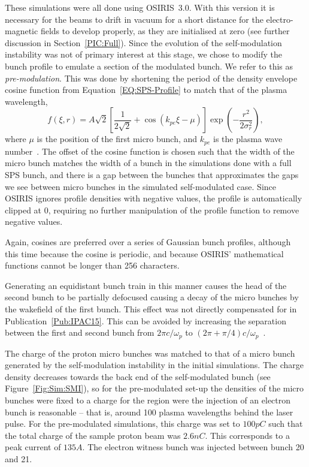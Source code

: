 These simulations were all done using OSIRIS~3.0.
With this version it is necessary for the beams to drift in vacuum for a short distance for the electro-magnetic fields to develop properly, as they are initialised at zero (see further discussion in Section~\ref{PIC:Full}).
Since the evolution of the self-modulation instability was not of primary interest at this stage, we chose to modify the bunch profile to emulate a section of the modulated bunch.
We refer to this as \textit{pre-modulation}.
This was done by shortening the period of the density envelope cosine function from Equation~\ref{EQ:SPS-Profile} to match that of the plasma wavelength,
\begin{equation}
    f(\xi,r) = A\sqrt{2} \left[\frac{1}{2\sqrt{2}}
             + \cos\left(k_{pe}\xi - \mu\right)\right] \exp\left(-\frac{r^{2}}{2\sigma_{r}^{2}}\right), \label{EQ:PB-PreMod}
\end{equation}
where $\mu$ is the position of the first micro bunch, and $k_{pe}$ is the plasma wave number~\cite{berglyd_olsen:2015}.
The offset of the cosine function is chosen such that the width of the micro bunch matches the width of a bunch in the simulations done with a full SPS bunch, and there is a gap between the bunches that approximates the gaps we see between micro bunches in the simulated self-modulated case.
Since OSIRIS ignores profile densities with negative values, the profile is automatically clipped at $0$, requiring no further manipulation of the profile function to remove negative values.

Again, cosines are preferred over a series of Gaussian bunch profiles, although this time because the cosine is periodic, and because OSIRIS' mathematical functions cannot be longer than 256 characters.

Generating an equidistant bunch train in this manner causes the head of the second bunch to be partially defocused causing a decay of the micro bunches by the wakefield of the first bunch.
This effect was not directly compensated for in Publication~\ref{Pub:IPAC15}.
This can be avoided by increasing the separation between the first and second bunch from $2\pi c/\omega_p$ to $(2\pi+\pi/4) c/\omega_p$~\cite{lotov:2018}.

The charge of the proton micro bunches was matched to that of a micro bunch generated by the self-modulation instability in the initial simulations.
The charge density decreases towards the back end of the self-modulated bunch (see Figure~\ref{Fig:Sim:SMI}), so for the pre-modulated set-up the densities of the micro bunches were fixed to a charge for the region were the injection of an electron bunch is reasonable -- that is, around 100 plasma wavelengths behind the laser pulse.
For the pre-modulated simulations, this charge was set to $100\unit{pC}$ such that the total charge of the sample proton beam was $2.6\unit{nC}$.
This corresponds to a peak current of $135\unit{A}$.
The electron witness bunch was injected between bunch 20 and 21.

